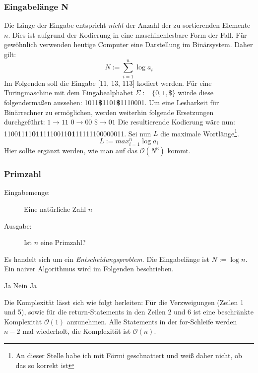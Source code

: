 \documentclass{article} %
\begin{document}
\subsubsection{Eingabelänge N}
Die Länge der Eingabe entspricht \emph{nicht} der Anzahl der zu sortierenden Elemente $n$.
Dies ist aufgrund der Kodierung in eine maschinenlesbare Form der Fall.
Für gewöhnlich verwenden heutige Computer eine Darstellung im Binärsystem. Daher gilt:
\begin{equation}
N := \sum_{i=1}^n \log a_i
\end{equation}
Im Folgenden soll die Eingabe [11, 13, 113] kodiert werden.
Für eine Turingmaschine mit dem Eingabealphabet $\Sigma := \{0,1,\$ \}$ würde diese folgendermaßen aussehen:
1011\textbf{\$}1101\textbf{\$}1110001.
Um eine Lesbarkeit für Binärrechner zu ermöglichen, werden weiterhin folgende Ersetzungen durchgeführt:
$1 \rightarrow 11$
$0 \rightarrow 00$
$\$ \rightarrow 01$
Die resultierende Kodierung wäre nun:
11001111\textbf{01}11110011\textbf{01}11111100000011.
Sei nun $L$ die maximale Wortlänge\footnote{An dieser Stelle habe ich mit Förmi geschnattert und weiß daher nicht, ob das so korrekt ist}.
\begin{equation}
L := max_{i=1}^n \log a_i
\end{equation}
Hier sollte ergänzt werden, wie man auf das $\mathcal{O}(N^3)$ kommt.

\subsubsection{Primzahl}
\begin{description}
	\item[Eingabemenge:] Eine natürliche Zahl $n$
	\item[Ausgabe:] Ist $n$ eine Primzahl? 
\end{description}
Es handelt sich um ein \emph{Entscheidungsproblem}.
Die Eingabelänge ist $N := \log n$.
Ein naiver Algorithmus wird im Folgenden beschrieben.

\begin{algorithmic}[1]
	 \State \Return Ja
	\Else {}
			\State \Return Nein
		\Else
		\EndIf
	\EndFor
	\State \Return Ja
	\EndIf
\end{algorithmic}

Die Komplexität lässt sich wie folgt herleiten:
Für die Verzweigungen (Zeilen 1 und 5), sowie für die return-Statements in den Zeilen 2 und 6 ist eine beschränkte Komplexität $\mathcal{O}(1)$ anzunehmen.
Alle Statements in der for-Schleife werden $n-2$ mal wiederholt, die Komplexität ist $\mathcal{O}(n)$.
\end{document}
